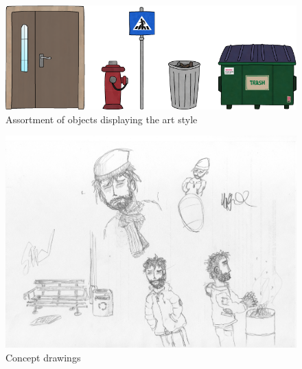 \documentclass[a4paper]{scrreprt}
\begin{document}
\begin{figure}[h]
\centering
\includegraphics[width=1\textwidth]{artstyle.png}
\caption{\label{fig:art} Assortment of objects displaying the art style}
\end{figure}

\begin{figure}[h]
\centering
\includegraphics[width=1\textwidth]{concept1.jpg}
\caption{\label{fig:concept} Concept drawings}
\end{figure}

\pagebreak
\end{document}
